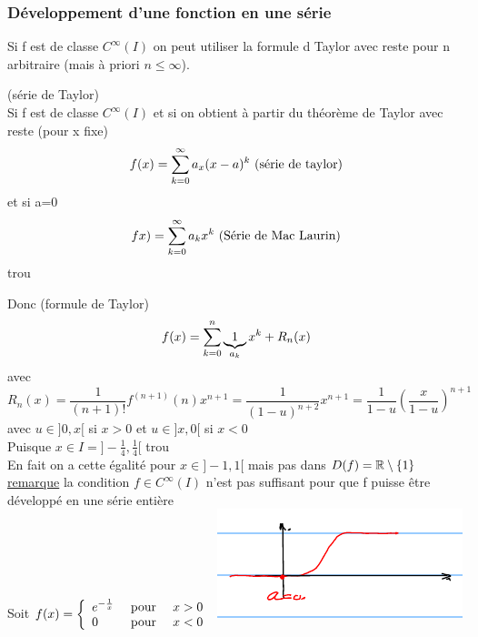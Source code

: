\documentclass[12pt,a4paper]{article}
\begin{document}
{\subsubsection{Développement d'une fonction en une série}
 Si f  est de classe $C^\infty(I)$ on peut utiliser la formule d Taylor avec reste pour n arbitraire (mais à priori $n \leq \infty$).
\begin{boite}
	\Theoreme (série de Taylor)\\
	Si f est de classe $C^\infty(I)$ et si  on obtient à partir du théorème de Taylor avec reste (pour x fixe)
	\begin{equation}
	f(x) = \somme{\infty}{k=0}{a_x(x-a)^k} \text{ (série de taylor)}
	\end{equation}
	et si a=0
	\begin{equation}
		fx) = \somme{\infty}{k=0}{a_kx^k} \text{ (Série de Mac Laurin)}
	\end{equation}
	{trou}
\end{boite}
Donc (formule de Taylor)
\begin{equation}
	f(x) = \somme{n}{k=0}{\underbrace{1}_{a_k} x^k + R_n(x)}
\end{equation}
avec
\begin{equation}
	R_n(x) = \frac{1}{(n+1)!}f^{(n+1)}(n)x^{n+1} = \frac{1}{(1-u)^{n+2}}x^{n+1} = \frac{1}{1-u}\left(\frac{x}{1-u}\right)^{n+1}
\end{equation}
avec $u \in ]0,x[$ si $x>0$ et $u \in]x,0[$ si $x<0$\\
Puisque $x\in I = ]-\frac{1}{4}, \frac{1}{4}$[
{trou}\\
En fait on a cette égalité pour $x \in ]-1,1[$ mais pas dans $D(f) = \R\setminus\{1\}$
\underline{remarque} la condition $f \in C^\infty(I)$ n'est pas suffisant pour que f puisse être développé en une série entière\\
Soit $f(x) = \left\{\begin{array}{lll}
e^{-\frac{1}{x}} & \pour & x>0\\
0 & \pour & x<0
\end{array}\right.$
\includegraphics[scale=0.5]{illustrations_analyse/e_1_sur_x_2}\\
}
\end{document}
